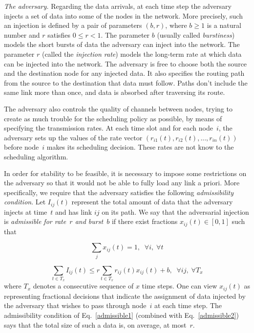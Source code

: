 \documentclass[journal,twocolumn]{./IEEEtran}
\begin{document}
\emph{The adversary.} Regarding the data arrivals, at each time step the adversary injects a set of data into some of the nodes in the network. More 
precisely,
such an injection is defined by a pair of parameters $(b,r)$, where $b \geq 1$ is a natural number and $r$ 
satisfies
$0 \leq r < 1$. The parameter $b$ (usually called \emph{burstiness}) models the short bursts of data 
the adversary
can inject into the network. The parameter $r$ (called the \emph{injection rate}) models the long-term rate at which data can be injected into the network. The adversary is free to choose both the source and the destination node for any injected data. It also specifies the routing path from 
the source to the destination that data must follow. Paths don't include the same link more than once, and data is absorbed after traversing its route. 

The adversary also controls the quality of channels between nodes, trying to create as much trouble for the scheduling policy as possible, by means of specifying the transmission rates. At each time slot and for each node~$i$, the adversary sets up the values of the rate vector $(r_{i1}(t), r_{i2}(t), ..., r_{in}(t))$ before node~$i$ makes its scheduling decision. 
These rates are not know to the scheduling algorithm.

In order for stability to be feasible, it is necessary to impose some restrictions on the adversary so that it 
would not be able to
fully load any link a priori. More specifically, we require that the adversary satisfies the following \emph{admissibility condition}. Let $I_{ij}(t)$ represent the total amount of data that the adversary injects at time~$t$ and has link $i j$ on its path. We say that the adversarial injection is 
{\em admissible for rate~$r$ and burst~$b$} if there exist fractions $x_{ij}(t) \in [0,1]$ such that

\begin{equation}
\label{admissible1}
\sum_{j} x_{ij}(t) = 1, \;\; \forall i, \; \forall t
\end{equation}

\begin{equation}
\label{admissible2}
\sum_{t \in T_x} I_{ij}(t) \leq r \sum_{t \in T_x} r_{ij}(t) x_{ij}(t) + b, \;\; \forall ij, \; \forall T_x
\end{equation}
where $T_x$ denotes a consecutive sequence of $x$ time steps. One can 
view
$x_{ij}(t)$ as representing fractional decisions that indicate the assignment of data injected by the adversary that wishes to pass through node~$i$ at each time step. The admissibility condition of Eq.~\ref{admissible1} (combined with Eq.~\ref{admissible2}) says that the total size of such a data is, on average, at most~$r$.
\end{document}
